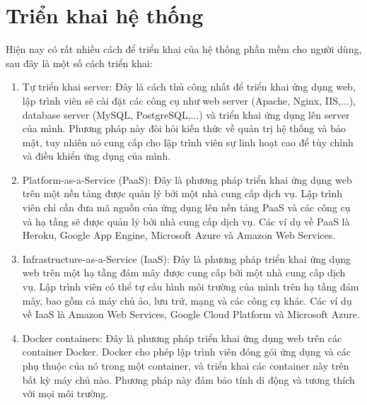 \section{Triển khai hệ thống}
Hiện nay có rất nhiều cách để triển khai của hệ thống phần mềm cho người dùng, sau đây là một số cách triển khai:
\begin{enumerate}
    \item Tự triển khai server: Đây là cách thủ công nhất để triển khai ứng dụng web, lập trình viên sẽ cài đặt các công cụ như web server (Apache, Nginx, IIS,...), database server (MySQL, PostgreSQL,...) và triển khai ứng dụng lên server của mình. Phương pháp này đòi hỏi kiến thức về quản trị hệ thống và bảo mật, tuy nhiên nó cung cấp cho lập trình viên sự linh hoạt cao để tùy chỉnh và điều khiển ứng dụng của mình.
    \item Platform-as-a-Service (PaaS): Đây là phương pháp triển khai ứng dụng web trên một nền tảng được quản lý bởi một nhà cung cấp dịch vụ. Lập trình viên chỉ cần đưa mã nguồn của ứng dụng lên nền tảng PaaS và các công cụ và hạ tầng sẽ được quản lý bởi nhà cung cấp dịch vụ. Các ví dụ về PaaS là Heroku, Google App Engine, Microsoft Azure và Amazon Web Services.
    \item Infrastructure-as-a-Service (IaaS): Đây là phương pháp triển khai ứng dụng web trên một hạ tầng đám mây được cung cấp bởi một nhà cung cấp dịch vụ. Lập trình viên có thể tự cấu hình môi trường của mình trên hạ tầng đám mây, bao gồm cả máy chủ ảo, lưu trữ, mạng và các công cụ khác. Các ví dụ về IaaS là Amazon Web Services, Google Cloud Platform và Microsoft Azure.
    \item Docker containers: Đây là phương pháp triển khai ứng dụng web trên các container Docker. Docker cho phép lập trình viên đóng gói ứng dụng và các phụ thuộc của nó trong một container, và triển khai các container này trên bất kỳ máy chủ nào. Phương pháp này đảm bảo tính di động và tương thích với mọi môi trường.
\end{enumerate}


